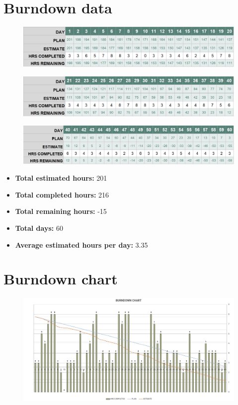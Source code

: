 \documentclass[11pt, a4paper]{article}
\begin{document}
\section{Burndown data}
\begin{figure}[H]
    \centering
    \includegraphics[width=1\textwidth]{images/burndown1.png}
\end{figure}
\begin{figure}[H]
    \centering
    \includegraphics[width=1\textwidth]{images/burndown2.png}
\end{figure}
\begin{figure}[H]
    \centering
    \includegraphics[width=1\textwidth]{images/burndown3.png}
\end{figure}
\begin{itemize}
    \item \textbf{Total estimated hours:} 201
    \item \textbf{Total completed hours:} 216
    \item \textbf{Total remaining hours:} -15
    \item \textbf{Total days:} 60
    \item \textbf{Average estimated hours per day:} 3.35
\end{itemize}

\newpage
\section{Burndown chart}
\begin{figure}[H]
    \centering
    \includegraphics[width=1\textwidth]{images/burndownchart.png}
\end{figure}
\end{document}
